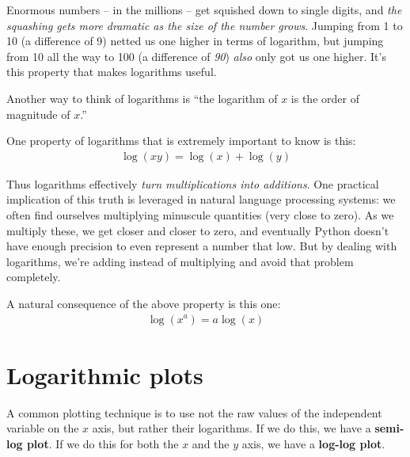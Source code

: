 Enormous numbers -- in the millions -- get squished down to single digits, and
\textit{the squashing gets more dramatic as the size of the number grows}.
Jumping from 1 to 10 (a difference of 9) netted us one higher in terms of
logarithm, but jumping from 10 all the way to 100 (a difference of
\textit{90}) \textit{also} only got us one higher. It's this property that
makes logarithms useful.


Another way to think of logarithms is ``the logarithm of $x$ is the order of
magnitude of $x$.''

One property of logarithms that is extremely important to know is this:
\begin{align*}
\log(xy) = \log(x) + \log(y)
\end{align*}

Thus logarithms effectively \textit{turn multiplications into additions}. One
practical implication of this truth is leveraged in natural language
processing systems: we often find ourselves multiplying minuscule quantities
(very close to zero). As we multiply these, we get closer and closer to zero,
and eventually Python doesn't have enough precision to even represent a number
that low. But by dealing with logarithms, we're adding instead of multiplying
and avoid that problem completely.

A natural consequence of the above property is this one:
\begin{align*}
\log(x^a) = a \log(x)
\end{align*}

\section{Logarithmic plots}


A common plotting technique is to use not the raw values of the independent
variable on the $x$ axis, but rather their logarithms. If we do this, we have
a \textbf{semi-log plot}. If we do this for both the $x$ and the $y$ axis, we
have a \textbf{log-log plot}.

